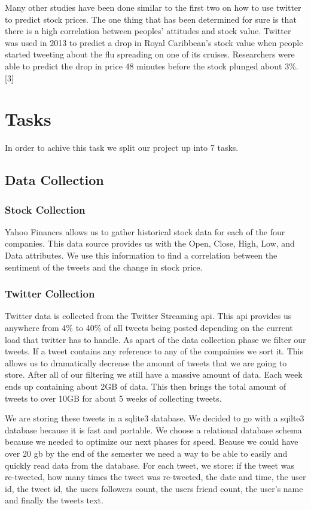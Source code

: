 \documentclass{acm_proc_article-sp}
\begin{document}
Many other studies have been done similar to the first two on how to use
twitter to predict stock prices. The one thing that has been determined for
sure is that there is a high correlation between peoples' attitudes and stock
value. Twitter was used in 2013 to predict a drop in Royal Caribbean's stock
value when people started tweeting about the flu spreading on one of its
cruises. Researchers were able to predict the drop in price 48 minutes before
the stock plunged about 3\%.[3]

\section{Tasks}
In order to achive this task we split our project up into 7 tasks.

\subsection{Data Collection} 
\subsubsection{Stock Collection} 

Yahoo Finances allows us to gather historical stock data for each of the four
companies.  This data source provides us with the Open, Close, High, Low, and
Data attributes. We use this information to find a correlation between the
sentiment of the tweets and the change in stock price.

\subsubsection{Twitter Collection} 

Twitter data is collected from the Twitter Streaming api. This api provides us
anywhere from 4\% to 40\% of all tweets being posted depending on the current
load that twitter has to handle. As apart of the data collection phase we
filter our tweets. If a tweet contains any reference to any of the compainies
we sort it. This allows us to dramatically decrease the amount of tweets that
we are going to store. After all of our filtering we still have a massive
amount of data. Each week ends up containing about 2GB of data. This then
brings the total amount of tweets to over 10GB for about 5 weeks of collecting
tweets. 

We are storing these tweets in a sqlite3 database. We decided to go with a
sqilte3 database because it is fast and portable. We choose a relational
database schema because we needed to optimize our next phases for speed. Beause
we could have over 20 gb by the end of the semester we need a way to be able to
easily and quickly read data from the database. For each tweet, we store:  if
the tweet was re-tweeted, how many times the tweet was re-tweeted, the date and
time, the user id, the tweet id, the users followers count, the users friend
count, the user's name and finally the tweets text. 
\end{document}

